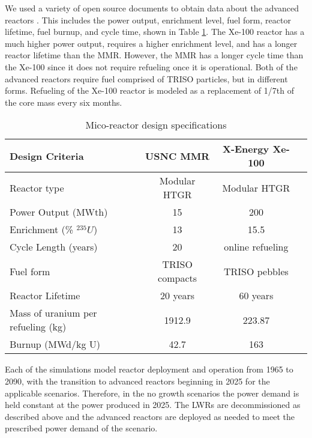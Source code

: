 We used a variety of open source documents to obtain data about the advanced reactors
\cite{harlan_x-energy_2018, hussain_advances_2018, mitchell_usnc_2020}. This includes 
the power output, enrichment level, fuel form, reactor lifetime, fuel 
burnup, and cycle time, shown in Table \ref{tab:reactor_summary}. 
The Xe-100 reactor has a much higher power output, requires a higher enrichment 
level, and has a longer reactor lifetime than the \gls{MMR}. However, the 
\gls{MMR} has a longer cycle time than the Xe-100 since it does not require 
refueling once it is operational. Both of the advanced reactors require fuel 
comprised of \gls{TRISO} particles, but in different forms. Refueling 
of the Xe-100 reactor is modeled as a replacement of 1/7th of the core mass 
every six months. 

\begin{table}[ht]
        \caption{Mico-reactor design specifications}
        \label{tab:reactor_summary}
        \begin{tabular}{l c c c}
            \hline
            Design Criteria & \gls{USNC} \gls{MMR} & 
                X-Energy Xe-100 \\\hline
            Reactor type & Modular HTGR & Modular HTGR \\
            Power Output (MWth) & 15 & 200 \\
            Enrichment (\% $^{235}U$) & 13 & 15.5 \\
            Cycle Length (years) & 20 & online refueling\\
            Fuel form & \gls{TRISO} compacts & \gls{TRISO} pebbles\\
            Reactor Lifetime & 20 years & 60 years \\
            Mass of uranium per refueling (kg) & 1912.9 & 223.87 \\
            Burnup (MWd/kg U) & 42.7 & 163 \\
            \hline
        \end{tabular}
    \end{table}

Each of the simulations model reactor deployment and operation from 1965 to 
2090, with the transition to advanced reactors beginning 
in 2025 for the applicable scenarios. Therefore, in the no growth scenarios 
the power demand is held constant 
at the power produced in 2025. The \glspl{LWR} are decommissioned as described 
above and the advanced reactors are deployed as needed to meet the prescribed 
power demand of the scenario. 

